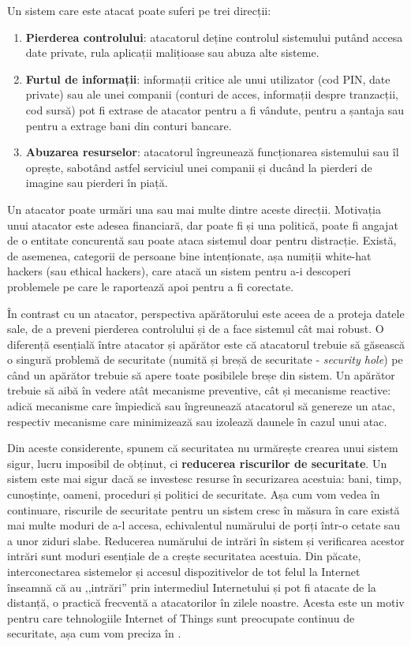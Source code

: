 Un sistem care este atacat poate suferi pe trei direcții:
\begin{enumerate}
  \item \textbf{Pierderea controlului}: atacatorul deține controlul sistemului putând accesa date private, rula aplicații malițioase sau abuza alte sisteme.
  \item \textbf{Furtul de informații}: informații critice ale unui utilizator (cod PIN, date private) sau ale unei companii (conturi de acces, informații despre tranzacții, cod sursă) pot fi extrase de atacator pentru a fi vândute, pentru a șantaja sau pentru a extrage bani din conturi bancare.
  \item \textbf{Abuzarea resurselor}: atacatorul îngreunează funcționarea sistemului sau îl oprește, sabotând astfel serviciul unei companii și ducând la pierderi de imagine sau pierderi în piață.
\end{enumerate}

Un atacator poate urmări una sau mai multe dintre aceste direcții. Motivația unui atacator este adesea financiară, dar poate fi și una politică, poate fi angajat de o entitate concurentă sau poate ataca sistemul doar pentru distracție. Există, de asemenea, categorii de persoane bine intenționate, așa numiții white-hat hackers (sau ethical hackers), care atacă un sistem pentru a-i descoperi problemele pe care le raportează apoi pentru a fi corectate.

În contrast cu un atacator, perspectiva apărătorului este aceea de a proteja datele sale, de a preveni pierderea controlului și de a face sistemul cât mai robust. O diferență esențială între atacator și apărător este că atacatorul trebuie să găsească o singură problemă de securitate (numită și breșă de securitate - \textit{security hole}) pe când un apărător trebuie să apere toate posibilele breșe din sistem. Un apărător trebuie să aibă în vedere atât mecanisme preventive, cât și mecanisme reactive: adică mecanisme care împiedică sau îngreunează atacatorul să genereze un atac, respectiv mecanisme care minimizează sau izolează daunele în cazul unui atac.

Din aceste considerente, spunem că securitatea nu urmărește crearea unui sistem sigur, lucru imposibil de obținut, ci \textbf{reducerea riscurilor de securitate}. Un sistem este mai sigur dacă se investesc resurse în securizarea acestuia: bani, timp, cunoștințe, oameni, proceduri și politici de securitate. Așa cum vom vedea în continuare, riscurile de securitate pentru un sistem cresc în măsura în care există mai multe moduri de a-l accesa, echivalentul numărului de porți într-o cetate sau a unor ziduri slabe. Reducerea numărului de intrări în sistem și verificarea acestor intrări sunt moduri esențiale de a crește securitatea acestuia. Din păcate, interconectarea sistemelor și accesul dispozitivelor de tot felul la Internet înseamnă că au ,,intrări'' prin intermediul Internetului și pot fi atacate de la distanță, o practică frecventă a atacatorilor în zilele noastre. Acesta este un motiv pentru care tehnologiile Internet of Things sunt preocupate continuu de securitate, așa cum vom preciza în .

